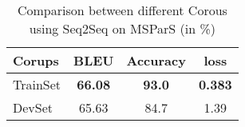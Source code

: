 \begin{table*}[htbp!] %
    \centering
    \begin{tabular}{lccc}
    \midrule
    Corups          & BLEU         & Accuracy      & loss\\
    \midrule
    TrainSet    & \bf66.08 & \bf93.0 & \bf0.383\\
    DevSet      & 65.63 & 84.7 & 1.39\\
    \bottomrule
    \end{tabular}
\caption{Comparison between different Corous using Seq2Seq on MSParS (in \%)}
\label{tab:bert}
\end{table*}
